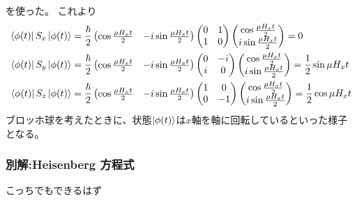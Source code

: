 \documentclass[../../master.tex]{subfiles}
\begin{document}
を使った。
これより
\begin{align}
    \bra{\phi(t)}S_x\ket{\phi(t)}
    &= \frac{\hbar}{2}\begin{pmatrix}
        \cos\frac{\mu H_x t}{2} & -i\sin\frac{\mu H_x t}{2}
    \end{pmatrix}
    \begin{pmatrix}
        0 & 1\\
        1 & 0
    \end{pmatrix}
    \begin{pmatrix}
        \cos\frac{\mu H_x t}{2}\\
        i\sin\frac{\mu H_x t}{2}
    \end{pmatrix}=0\\
    \bra{\phi(t)}S_y\ket{\phi(t)}
    &= \frac{\hbar}{2}\begin{pmatrix}
        \cos\frac{\mu H_x t}{2} & -i\sin\frac{\mu H_x t}{2}
    \end{pmatrix}
    \begin{pmatrix}
        0 & -i\\
        i & 0
    \end{pmatrix}
    \begin{pmatrix}
        \cos\frac{\mu H_x t}{2}\\
        i\sin\frac{\mu H_x t}{2}
    \end{pmatrix}=\frac{1}{2}\sin\mu H_x t\\
    \bra{\phi(t)}S_z\ket{\phi(t)}
    &= \frac{\hbar}{2}\begin{pmatrix}
        \cos\frac{\mu H_x t}{2} & -i\sin\frac{\mu H_x t}{2}
    \end{pmatrix}
    \begin{pmatrix}
        1 & 0\\
        0 & -1
    \end{pmatrix}
    \begin{pmatrix}
        \cos\frac{\mu H_x t}{2}\\
        i\sin\frac{\mu H_x t}{2}
    \end{pmatrix}=\frac{1}{2}\cos\mu H_x t
\end{align}
ブロッホ球を考えたときに、状態\(\ket{\phi(t)}\)は\(x\)軸を軸に回転しているといった様子となる。
\subsubsection{別解:Heisenberg 方程式}
こっちでもできるはず
\end{document}
